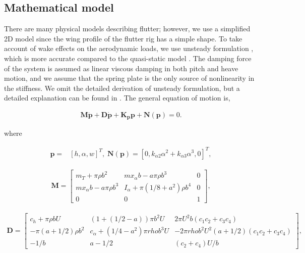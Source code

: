\documentclass[openacc]{rsproca_new}%
\theoremstyle{own}
\def\vec#1{\ensuremath{\mathbf{#1}}}
\begin{document}
\subsection{Mathematical model}\label{Math_model}
There are many physical models describing flutter; however, we use a simplified 2D model since the wing profile of the flutter rig has a simple shape. To take account of wake effects on the aerodynamic loads, we use unsteady formulation \cite{abdelkefi2013analytical}, which is more accurate compared to the quasi-static model \cite{strganac2000identification}. The damping force of the system is assumed as linear viscous damping in both pitch and heave motion, and we assume that the spring plate is the only source of nonlinearity in the stiffness. We omit the detailed derivation of unsteady formulation, but a detailed explanation can be found in \cite{abdelkefi2013analytical}. The general equation of motion is,

\begin{align}\label{eq:2-1}
\vec{M} \ddot{\vec{p}} + \vec{D} \dot{\vec{p}} +\vec{K_p} \vec{p} + \vec{N}(\vec{p}) =0.
\end{align}

\noindent where

\begin{align}\label{eq:2-2}
\vec{p}=&[h,\alpha,w]^T, \; \vec{N}(\vec{p})=[0,k_{\alpha 2}\alpha^2+k_{\alpha 3}\alpha^3,0]^T,
\end{align}

\begin{align}\label{eq:2-3}
\vec{M}=
\begin{bmatrix}
    m_T+\pi \rho b^2       & m x_\alpha b-a\pi\rho b^3 & 0 \\
    m x_\alpha b-a\pi\rho b^3       & I_\alpha+\pi(1/8+a^2)\rho b^4 & 0 \\
    0       & 0 & 1
\end{bmatrix},
\end{align}

\begin{align}\label{eq:2-4}
\vec D=
\begin{bmatrix}
      c_h+\pi \rho b U        & (1+(1/2-a))\pi b^2 U & 2 \pi U^2 b (c_1c_2+c_3c_4) \\
      -\pi (a+1/2)\rho b^2        & c_\alpha+(1/4-a^2)\pi rho b^3 U & -2 \pi rho b^2 U^2 (a+1/2)(c_1c_2+c_3c_4) \\
      -1/b       & a-1/2 & (c_2+c_4)U/b
\end{bmatrix},
\end{align}
\end{document}
